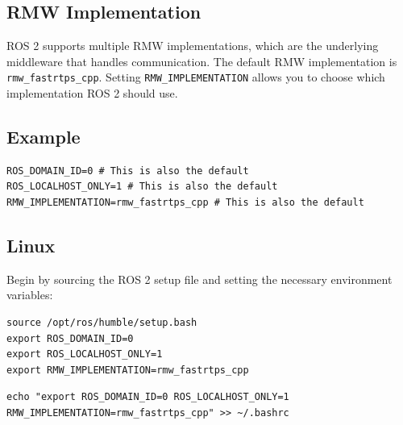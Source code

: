 \subsection{RMW Implementation}

ROS 2 supports multiple RMW implementations, which are the underlying middleware that handles communication. The default RMW implementation is \texttt{rmw\_fastrtps\_cpp}. Setting \texttt{RMW\_IMPLEMENTATION} allows you to choose which implementation ROS 2 should use.

\subsection{Example}

\begin{verbatim}
ROS_DOMAIN_ID=0 # This is also the default
ROS_LOCALHOST_ONLY=1 # This is also the default
RMW_IMPLEMENTATION=rmw_fastrtps_cpp # This is also the default
\end{verbatim}



\subsection{Linux}

Begin by sourcing the ROS 2 setup file and setting the necessary environment variables:

\begin{verbatim}
source /opt/ros/humble/setup.bash
export ROS_DOMAIN_ID=0
export ROS_LOCALHOST_ONLY=1
export RMW_IMPLEMENTATION=rmw_fastrtps_cpp
\end{verbatim}


\begin{verbatim}
echo "export ROS_DOMAIN_ID=0 ROS_LOCALHOST_ONLY=1 RMW_IMPLEMENTATION=rmw_fastrtps_cpp" >> ~/.bashrc
\end{verbatim}


